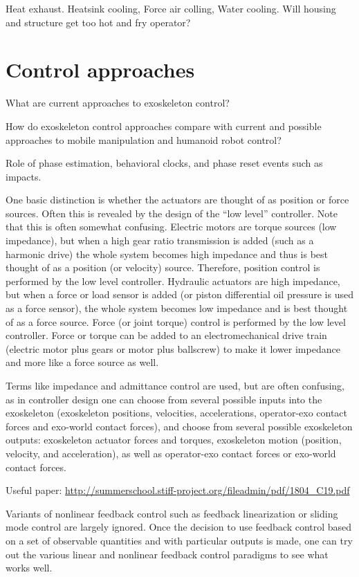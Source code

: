 \documentclass[letterpaper,12pt,fullpage]{article}
\begin{document}
Heat exhaust. Heatsink cooling, Force air colling, Water cooling.
Will housing and structure get too hot and fry operator?

\section{Control approaches}

What are current approaches to exoskeleton control?

How do exoskeleton control approaches compare with current and
possible approaches to mobile manipulation and humanoid robot control?

Role of phase estimation, behavioral clocks, and phase reset events
such as impacts.

One basic distinction is whether the actuators are thought of as position
or force sources. Often this is revealed by the design of the ``low level''
controller. Note that this is often somewhat confusing. Electric motors
are torque sources (low impedance), but when a high gear ratio transmission
is added (such as a harmonic drive) the whole system becomes high impedance
and thus is best thought of as a position (or velocity) source. Therefore,
position control is performed by the low level controller. Hydraulic actuators
are high impedance, but when a force or load sensor is added (or piston differential
oil pressure is used as a force sensor), the whole system becomes low impedance
and is best thought of as a force source. Force (or joint torque) control is
performed by the low level controller. Force or torque can be added to an
electromechanical drive train (electric motor plus gears or motor plus ballscrew)
to make it lower impedance and more like a force source as well.

Terms like impedance and admittance control are used, but are often confusing,
as in controller design one can choose from several possible
inputs into the exoskeleton (exoskeleton positions,
velocities, accelerations, operator-exo contact forces and
exo-world contact forces), and choose from several possible exoskeleton
outputs: exoskeleton actuator forces and torques, exoskeleton
motion (position, velocity, and acceleration), as well as operator-exo
contact forces or exo-world contact forces.

Useful paper: \url{http://summerschool.stiff-project.org/fileadmin/pdf/1804_C19.pdf}

Variants of nonlinear feedback control such as feedback linearization or
sliding mode control are largely ignored. Once the decision to use feedback control
based on a set of observable quantities and with particular outputs is made,
one can try out the various linear and nonlinear feedback control paradigms
to see what works well.
\end{document}
